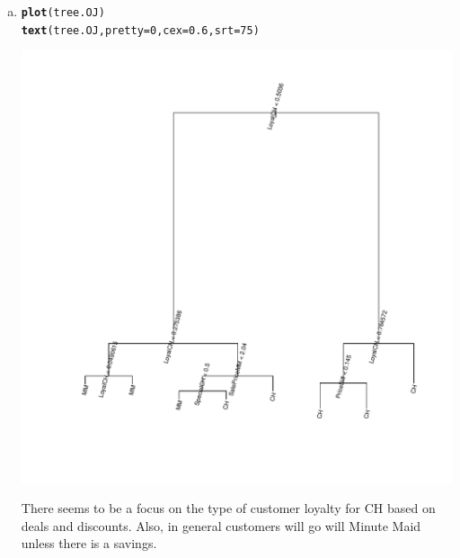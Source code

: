 \documentclass{article}\usepackage[]{graphicx}\usepackage[]{color}
\makeatletter
\def\maxwidth{ %
  \ifdim\Gin@nat@width>\linewidth
    \linewidth
  \else
    \Gin@nat@width
  \fi
}
\newcommand{\hlnum}[1]{\textcolor[rgb]{0.686,0.059,0.569}{#1}}%
\newcommand{\hlstd}[1]{\textcolor[rgb]{0.345,0.345,0.345}{#1}}%
\newcommand{\hlkwc}[1]{\textcolor[rgb]{0.333,0.667,0.333}{#1}}%
\newcommand{\hlkwd}[1]{\textcolor[rgb]{0.737,0.353,0.396}{\textbf{#1}}}%
\newenvironment{kframe}{%
 \def\at@end@of@kframe{}%
 \ifinner\ifhmode%
  \def\at@end@of@kframe{\end{minipage}}%
  \begin{minipage}{\columnwidth}%
 \fi\fi%
 \def\FrameCommand##1{\hskip\@totalleftmargin \hskip-\fboxsep
 \colorbox{shadecolor}{##1}\hskip-\fboxsep
     \hskip-\linewidth \hskip-\@totalleftmargin \hskip\columnwidth}%
 \MakeFramed {\advance\hsize-\width
   \@totalleftmargin\z@ \linewidth\hsize
   \@setminipage}}%
 {\par\unskip\endMakeFramed%
 \at@end@of@kframe}
\newenvironment{knitrout}{}{} %
\makeatother
\begin{document}
\begin{enumerate}[(a)]
\item
\begin{knitrout}
\color{fgcolor}\begin{kframe}
\begin{alltt}
\hlkwd{plot}\hlstd{(tree.OJ)}
\hlkwd{text}\hlstd{(tree.OJ,}\hlkwc{pretty} \hlstd{=}\hlnum{0}\hlstd{,}\hlkwc{cex}\hlstd{=}\hlnum{0.6}\hlstd{,}\hlkwc{srt}\hlstd{=}\hlnum{75}\hlstd{)}
\end{alltt}
\end{kframe}
\includegraphics[width=\maxwidth]{figure/unnamed-chunk-8-1} 

\end{knitrout}
There seems to be a focus on the type of customer loyalty for CH based on deals and discounts. Also, in general customers will go will Minute Maid unless there is a savings.


\end{enumerate}
\end{document}

